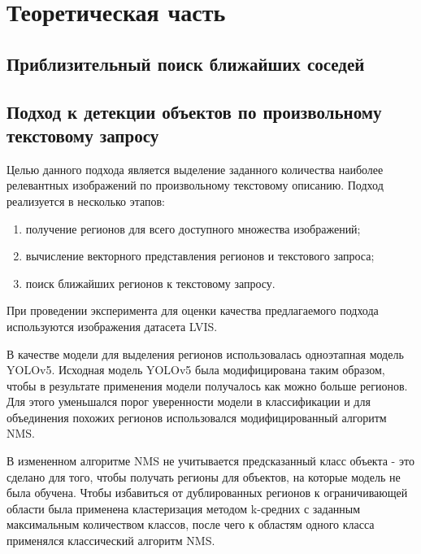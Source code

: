\documentclass[a4paper,14pt]{article}
\begin{document}
    \newpage


    \section{Теоретическая часть}
    
    \subsection{Приблизительный поиск ближайших соседей}
    
    \subsection{Подход к детекции объектов по произвольному текстовому запросу}
    
    Целью данного подхода является выделение заданного количества наиболее релевантных изображений по произвольному текстовому описанию. Подход реализуется в несколько этапов:
     \begin{enumerate}
    	[1)]
    	\itemsep0em
    	\item получение регионов для всего доступного множества изображений;
    	\item вычисление векторного представления регионов и текстового запроса;
    	\item поиск ближайших регионов к текстовому запросу.
    \end{enumerate}
    
    При проведении эксперимента для оценки качества предлагаемого подхода используются изображения датасета LVIS. 
    
    В качестве модели для выделения регионов использовалась одноэтапная модель YOLOv5. Исходная модель YOLOv5 была модифицирована таким образом, чтобы в результате применения модели получалось как можно больше регионов. Для этого уменьшался порог уверенности модели в классификации и для объединения похожих регионов использовался модифицированный алгоритм NMS. 
    
    В измененном алгоритме NMS не учитывается предсказанный класс объекта - это сделано для того, чтобы получать регионы  для объектов, на которые модель не была обучена. Чтобы избавиться от дублированных регионов к ограничивающей области была применена кластеризация методом k-средних с заданным максимальным количеством классов, после чего к областям одного класса применялся классический алгоритм NMS. 
    
    
\end{document}
